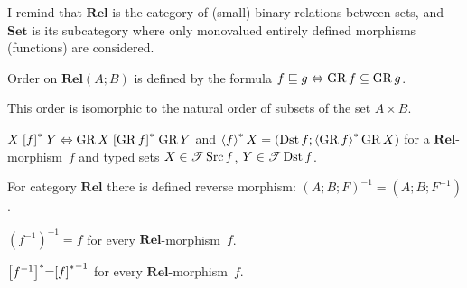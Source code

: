 I remind that $\mathbf{Rel}$ is the category of (small) binary relations
between sets, and $\mathbf{Set}$ is its subcategory where only monovalued
entirely defined morphisms (functions) are considered.
\begin{defn}
Order on $\mathbf{Rel}(A;B)$ is defined by the formula $f\sqsubseteq g\Leftrightarrow\operatorname{GR} f\subseteq\operatorname{GR} g$.\end{defn}
\begin{obvious}
This order is isomorphic to the natural order of subsets of the set
$A\times B$.\end{obvious}
\begin{defn}
$X\mathrel{\left[f\right]^{\ast}}Y\Leftrightarrow\operatorname{GR} X\mathrel{\left[\operatorname{GR} f\right]^{\ast}}\operatorname{GR} Y$ and $\left\langle f\right\rangle ^{\ast}X=(\operatorname{Dst} f;\left\langle \operatorname{GR} f\right\rangle ^{\ast}\operatorname{GR} X)$
for a $\mathbf{Rel}$-morphism~$f$ and typed sets $X\in\mathscr{T}\operatorname{Src} f$,
$Y\in\mathscr{T}\operatorname{Dst} f$.
\end{defn}

\begin{defn}
For category $\mathbf{Rel}$ there is defined reverse morphism: $(A;B;F)^{-1}=(A;B;F^{-1})$.\end{defn}
\begin{obvious}
$(f^{-1})^{-1}=f$ for every $\mathbf{Rel}$-morphism~$f$.
\end{obvious}

\begin{obvious}
$\mathrel{\left[f^{-1}\right]^{\ast}}=\mathrel{\left[f\right]^{\ast}}^{-1}$ for every $\mathbf{Rel}$-morphism~$f$.
\end{obvious}

